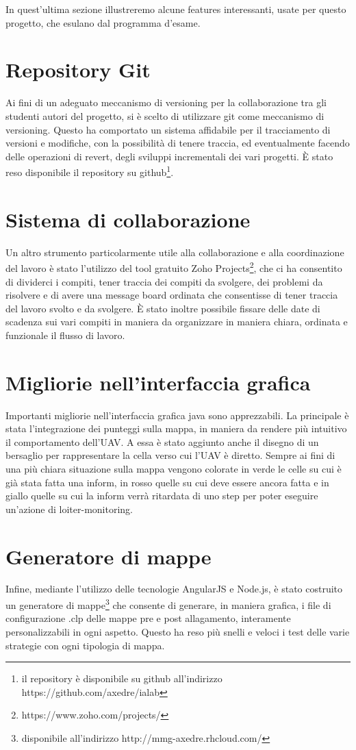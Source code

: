 In quest'ultima sezione illustreremo alcune features interessanti, usate per questo progetto, che esulano dal programma d'esame.
\section{Repository Git} \label{sec:repo}
Ai fini di un adeguato meccanismo di versioning per la collaborazione tra gli studenti autori del progetto, si è scelto di utilizzare git come meccanismo di versioning. Questo ha comportato un sistema affidabile per il tracciamento di versioni e modifiche, con la possibilità di tenere traccia, ed eventualmente facendo delle operazioni di revert, degli sviluppi incrementali dei vari progetti. È stato reso disponibile il repository su github\footnote{il repository è disponibile su github all'indirizzo https://github.com/axedre/ialab}.

\section{Sistema di collaborazione} \label{sec:collaborazione}
Un altro strumento particolarmente utile alla collaborazione e alla coordinazione del lavoro è stato l'utilizzo del tool gratuito Zoho Projects\footnote{https://www.zoho.com/projects/}, che ci ha consentito di dividerci i compiti, tener traccia dei compiti da svolgere, dei problemi da risolvere e di avere una message board ordinata che consentisse di tener traccia del lavoro svolto e da svolgere.
È stato inoltre possibile fissare delle date di scadenza sui vari compiti in maniera da organizzare in maniera chiara, ordinata e funzionale il flusso di lavoro.

\section{Migliorie nell'interfaccia grafica} \label{sec:grafica}
Importanti migliorie nell'interfaccia grafica java sono apprezzabili. La principale è stata l'integrazione dei punteggi sulla mappa, in maniera da rendere più intuitivo il comportamento dell'UAV. A essa è stato aggiunto anche il disegno di un bersaglio per rappresentare la cella verso cui l'UAV è diretto.
Sempre ai fini di una più chiara situazione sulla mappa vengono colorate in verde le celle su cui è già stata fatta una inform, in rosso quelle su cui deve essere ancora fatta e in giallo quelle su cui la inform verrà ritardata di uno step per poter eseguire un'azione di loiter-monitoring.

\section{Generatore di mappe} \label{sec:generatore}
Infine, mediante l'utilizzo delle tecnologie AngularJS e Node.js, è stato costruito un generatore di mappe\footnote{disponibile all'indirizzo http://mmg-axedre.rhcloud.com/} che consente di generare, in maniera grafica, i file di configurazione .clp delle mappe pre e post allagamento, interamente personalizzabili in ogni aspetto. Questo ha reso più snelli e veloci i test delle varie strategie con ogni tipologia di mappa.
